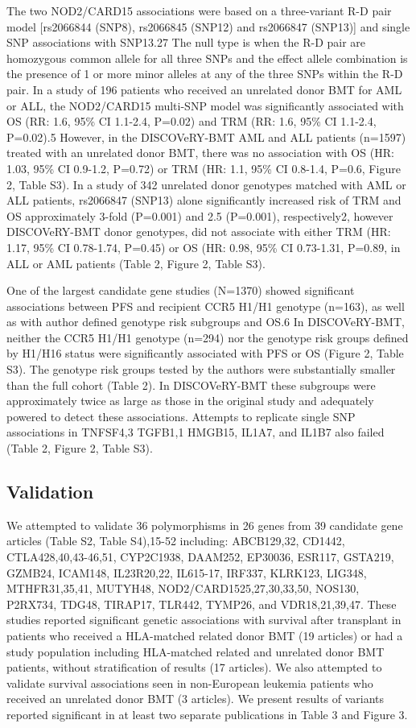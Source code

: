 \documentclass[]{DissertateUSU}
\begin{document}
The two NOD2/CARD15 associations were based on a three-variant R-D pair
model {[}rs2066844 (SNP8), rs2066845 (SNP12) and rs2066847 (SNP13){]}
and single SNP associations with SNP13.27 The null type is when the R-D
pair are homozygous common allele for all three SNPs and the effect
allele combination is the presence of 1 or more minor alleles at any of
the three SNPs within the R-D pair. In a study of 196 patients who
received an unrelated donor BMT for AML or ALL, the NOD2/CARD15
multi-SNP model was significantly associated with OS (RR: 1.6, 95\% CI
1.1-2.4, P=0.02) and TRM (RR: 1.6, 95\% CI 1.1-2.4, P=0.02).5 However,
in the DISCOVeRY-BMT AML and ALL patients (n=1597) treated with an
unrelated donor BMT, there was no association with OS (HR: 1.03, 95\% CI
0.9-1.2, P=0.72) or TRM (HR: 1.1, 95\% CI 0.8-1.4, P=0.6, Figure 2,
Table S3). In a study of 342 unrelated donor genotypes matched with AML
or ALL patients, rs2066847 (SNP13) alone significantly increased risk of
TRM and OS approximately 3-fold (P=0.001) and 2.5 (P=0.001),
respectively2, however DISCOVeRY-BMT donor genotypes, did not associate
with either TRM (HR: 1.17, 95\% CI 0.78-1.74, P=0.45) or OS (HR: 0.98,
95\% CI 0.73-1.31, P=0.89, in ALL or AML patients (Table 2, Figure 2,
Table S3).

One of the largest candidate gene studies (N=1370) showed significant
associations between PFS and recipient CCR5 H1/H1 genotype (n=163), as
well as with author defined genotype risk subgroups and OS.6 In
DISCOVeRY-BMT, neither the CCR5 H1/H1 genotype (n=294) nor the genotype
risk groups defined by H1/H16 status were significantly associated with
PFS or OS (Figure 2, Table S3). The genotype risk groups tested by the
authors were substantially smaller than the full cohort (Table 2). In
DISCOVeRY-BMT these subgroups were approximately twice as large as those
in the original study and adequately powered to detect these
associations. Attempts to replicate single SNP associations in TNFSF4,3
TGFB1,1 HMGB15, IL1A7, and IL1B7 also failed (Table 2, Figure 2, Table
S3).

\subsection{Validation}\label{validation}

We attempted to validate 36 polymorphisms in 26 genes from 39 candidate
gene articles (Table S2, Table S4),15-52 including: ABCB129,32, CD1442,
CTLA428,40,43-46,51, CYP2C1938, DAAM252, EP30036, ESR117, GSTA219,
GZMB24, ICAM148, IL23R20,22, IL615-17, IRF337, KLRK123, LIG348,
MTHFR31,35,41, MUTYH48, NOD2/CARD1525,27,30,33,50, NOS130, P2RX734,
TDG48, TIRAP17, TLR442, TYMP26, and VDR18,21,39,47. These studies
reported significant genetic associations with survival after transplant
in patients who received a HLA-matched related donor BMT (19 articles)
or had a study population including HLA-matched related and unrelated
donor BMT patients, without stratification of results (17 articles). We
also attempted to validate survival associations seen in non-European
leukemia patients who received an unrelated donor BMT (3 articles). We
present results of variants reported significant in at least two
separate publications in Table 3 and Figure 3.
\end{document}
